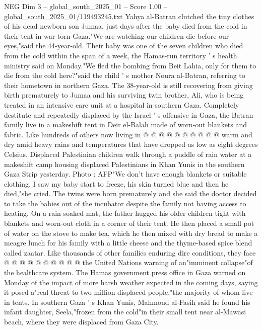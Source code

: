 \begin{textsample}{NEG Dim 3 – global\_south\_2025\_01 – Score 1.00 – global\_south\_2025\_01/119493245.txt}  \label{ex:f3_neg_073}
Yahya al-Batran clutched the tiny clothes of his dead newborn son Jumaa, just days after the baby died from the cold in their tent in war-torn Gaza."We are watching our children die before our eyes,"said the 44-year-old.
Their baby was one of the seven children who died from the cold within the span of a week, the Hamas-run territory ' s health ministry said on Monday."We fled the bombing from Beit Lahia, only for them to die from the cold here?"said the child ' s mother Noura al-Batran, referring to their hometown in northern Gaza.
The 38-year-old is still recovering from giving birth prematurely to Jumaa and his surviving twin brother, Ali, who is being treated in an intensive care unit at a hospital in southern Gaza.
Completely destitute and repeatedly displaced by the Israel ' s offensive in Gaza, the Batran family live in a makeshift tent in Deir el-Balah made of worn-out blankets and fabric.
Like hundreds of others now living in @ @ @ @ @ @ @ @ @ @ warm and dry amid heavy rains and temperatures that have dropped as low as eight degrees Celsius.
Displaced Palestinian children walk through a puddle of rain water at a makeshift camp housing displaced Palestinians in Khan Yunis in the southern Gaza Strip yesterday.
Photo : AFP"We don't have enough blankets or suitable clothing.
I saw my baby start to freeze, his skin turned blue and then he died,"she cried.
The twins were born prematurely and she said the doctor decided to take the babies out of the incubator despite the family not having access to heating.
On a rain-soaked mat, the father hugged his older children tight with blankets and worn-out cloth in a corner of their tent.
He then placed a small pot of water on the stove to make tea, which he then mixed with dry bread to make a meagre lunch for his family with a little cheese and the thyme-based spice blend called zaatar.
Like thousands of other families enduring dire conditions, they face @ @ @ @ @ @ @ @ @ @ the United Nations warning of an"imminent collapse"of the healthcare system.
The Hamas government press office in Gaza warned on Monday of the impact of more harsh weather expected in the coming days, saying it posed a"real threat to two million displaced people,"the majority of whom live in tents.
In southern Gaza ' s Khan Yunis, Mahmoud al-Fasih said he found his infant daughter, Seela,"frozen from the cold"in their small tent near al-Mawasi beach, where they were displaced from Gaza City.

\end{textsample}
